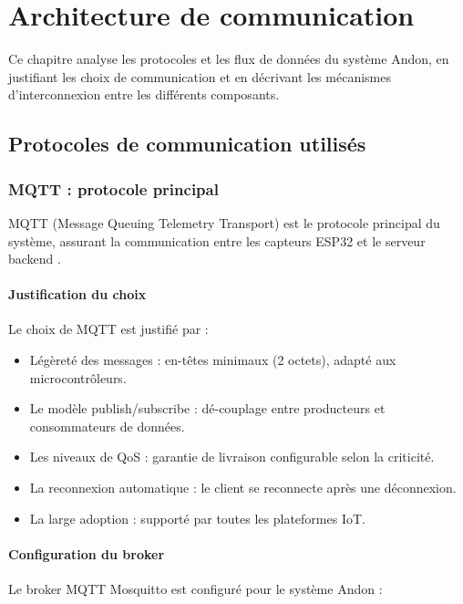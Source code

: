 \chapter{Architecture de communication}

Ce chapitre analyse les protocoles et les flux de donn\'ees du syst\`eme Andon, en justifiant les choix de communication et en d\'ecrivant les m\'ecanismes d'interconnexion entre les diff\'erents composants.

\section{Protocoles de communication utilis\'es}

\subsection{MQTT : protocole principal}

MQTT (Message Queuing Telemetry Transport) est le protocole principal du syst\`eme, assurant la communication entre les capteurs ESP32 et le serveur backend \cite{banks2014mqtt}.

\subsubsection{Justification du choix}

Le choix de MQTT est justifi\'e par :

\begin{itemize}
    \item L\'eg\`eret\'e des messages : en-t\^etes minimaux (2 octets), adapt\'e aux microcontr\^oleurs.
    \item Le mod\`ele publish/subscribe : d\'e-couplage entre producteurs et consommateurs de donn\'ees.
    \item Les niveaux de QoS : garantie de livraison configurable selon la criticit\'e.
    \item La reconnexion automatique : le client se reconnecte apr\`es une d\'econnexion.
    \item La large adoption : support\'e par toutes les plateformes IoT.
\end{itemize}

\subsubsection{Configuration du broker}

Le broker MQTT Mosquitto est configur\'e pour le syst\`eme Andon :

